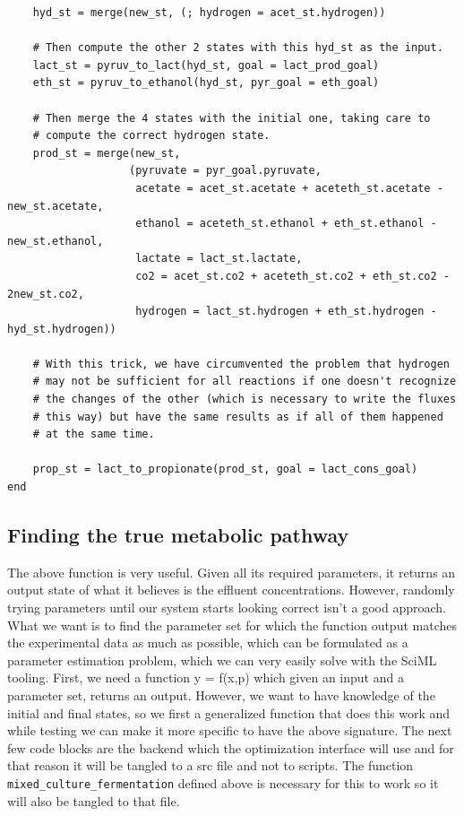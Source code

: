 \documentclass[11pt]{article}
\begin{document}
\begin{verbatim}
    hyd_st = merge(new_st, (; hydrogen = acet_st.hydrogen))

    # Then compute the other 2 states with this hyd_st as the input.
    lact_st = pyruv_to_lact(hyd_st, goal = lact_prod_goal)
    eth_st = pyruv_to_ethanol(hyd_st, pyr_goal = eth_goal)

    # Then merge the 4 states with the initial one, taking care to
    # compute the correct hydrogen state.
    prod_st = merge(new_st,
                   (pyruvate = pyr_goal.pyruvate,
                    acetate = acet_st.acetate + aceteth_st.acetate - new_st.acetate,
                    ethanol = aceteth_st.ethanol + eth_st.ethanol - new_st.ethanol,
                    lactate = lact_st.lactate,
                    co2 = acet_st.co2 + aceteth_st.co2 + eth_st.co2 - 2new_st.co2,
                    hydrogen = lact_st.hydrogen + eth_st.hydrogen - hyd_st.hydrogen))

    # With this trick, we have circumvented the problem that hydrogen
    # may not be sufficient for all reactions if one doesn't recognize
    # the changes of the other (which is necessary to write the fluxes
    # this way) but have the same results as if all of them happened
    # at the same time.

    prop_st = lact_to_propionate(prod_st, goal = lact_cons_goal)
end

\end{verbatim}

\subsection{Finding the true metabolic pathway}
\label{sec:orgbc374a8}
The above function is very useful. Given all its required parameters, it returns an output state of what it believes is the effluent concentrations. However, randomly trying parameters until our system starts looking correct isn't a good approach. What we want is to find the parameter set for which the function output matches the experimental data as much as possible, which can be formulated as a parameter estimation problem, which we can very easily solve with the SciML tooling. First, we need a function y = f(x,p) which given an input and a parameter set, returns an output. However, we want to have knowledge of the initial and final states, so we first a generalized function that does this work and while testing we can make it more specific to have the above signature. The next few code blocks are the backend which the optimization interface will use and for that reason it will be tangled to a src file and not to scripts. The function \texttt{mixed\_culture\_fermentation} defined above is necessary for this to work so it will also be tangled to that file.
\end{document}
